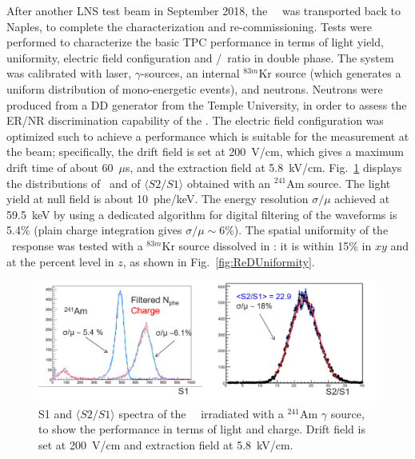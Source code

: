 After another LNS test beam in September 2018, the \ReD\ \TPC\ was transported back to 
Naples, to complete the characterization and re-commissioning. Tests were
performed to characterize the basic TPC performance in terms of light yield, 
uniformity, electric field configuration and \STwo/\SOne\ ratio in double phase. The system was 
calibrated with laser, $\gamma$-sources, an internal $^{83m}$Kr source 
(which generates a uniform distribution of mono-energetic events), and neutrons. 
Neutrons were produced from a DD generator from the Temple University, in order to assess the 
ER/NR discrimination capability of the \TPC. 
The electric field configuration was optimized such to achieve a performance 
which is suitable for the measurement at the beam; specifically, the drift field is set 
at 200~V/cm, which gives a maximum drift time of about 60~$\mu$s, and the extraction 
field at 5.8~kV/cm. Fig.~\ref{fig:TPCperformance} displays the distributions of \SOne\ and 
of $\langle S2/S1 \rangle$ obtained with an $^{241}$Am source. The light yield at null 
field is about 10~phe/keV. The energy resolution $\sigma/\mu$ achieved at 59.5~keV by 
using a dedicated algorithm for digital filtering of the waveforms is 5.4\% (plain 
charge integration gives $\sigma/\mu \sim 6\%$). The spatial uniformity of the \TPC\ response 
was tested with a $^{83m}$Kr source dissolved in \LAr: it is within 15\% in $xy$ and 
at the percent level in $z$, as shown in Fig.~\ref{fig:ReDUniformity}. 
%
\begin{figure}[tbp!]
\centering
\includegraphics[width=0.95\columnwidth]{./Figures/TPCperformance.png}
\caption[\ReD\ \TPC\ performance]{S1 and $\langle S2/S1 \rangle$ spectra of the 
\ReD\ \TPC\ irradiated with a $^{241}$Am $\gamma$ source, to show the performance in terms of light 
and charge. Drift field is set at 200~V/cm and extraction field at 5.8~kV/cm.}
\label{fig:TPCperformance}
\end{figure}
%
